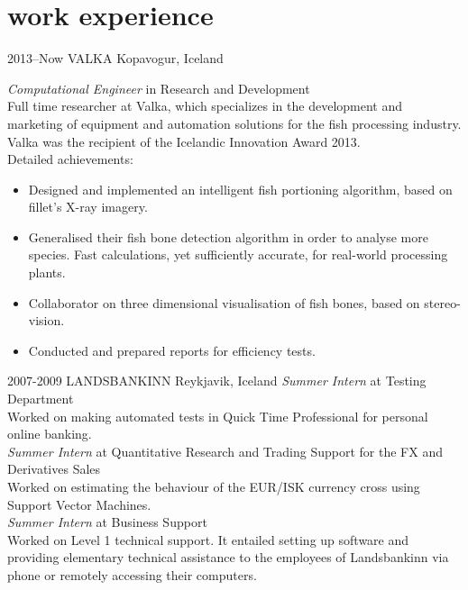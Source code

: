 \documentclass[]{cv} %
\begin{document}
\section{work experience}


\begin{entrylist}
\entry
{2013--Now}
{VALKA}
{Kopavogur, Iceland}
{\emph{Computational Engineer} in Research and Development \\
Full time researcher at Valka, which specializes in the development and marketing of equipment and automation solutions for the fish processing industry. Valka was the recipient of the Icelandic Innovation Award 2013. \\
Detailed achievements:
\begin{itemize}
\item Designed and implemented an intelligent fish portioning algorithm, based on fillet's X-ray imagery. 
\item Generalised their fish bone detection algorithm in order to analyse more species. Fast calculations, yet sufficiently accurate, for real-world processing plants.
\item Collaborator on three dimensional visualisation of fish bones, based on stereo-vision.
\item Conducted and prepared reports for efficiency tests.
\end{itemize}
}
\entry
{2007-2009}
{LANDSBANKINN}
{Reykjavik, Iceland}
{
\emph{Summer Intern} at Testing Department \\ Worked on making automated tests in Quick Time Professional for personal online banking. 
\\
\emph{Summer Intern} at Quantitative Research and Trading Support for the FX and Derivatives Sales \\ Worked on estimating the behaviour of the EUR/ISK currency cross using Support Vector Machines.
\\
\emph{Summer Intern} at Business Support \\ Worked on Level 1 technical support. It entailed setting up software and providing elementary technical assistance to the employees of Landsbankinn via phone or remotely accessing their computers.
}
\end{entrylist}
\vfill
\end{document}
